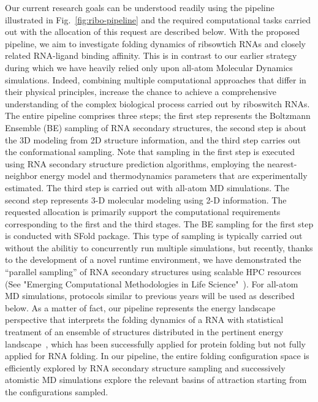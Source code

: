 \documentclass[a4paper,10pt]{article}
\begin{document}
Our current research goals can be understood readily using the pipeline illustrated in Fig.~\ref{fig:ribo-pipeline} and the required computational tasks carried out with the allocation of this request are described below. With the proposed pipeline, we aim to investigate folding dynamics of ribsowtich RNAs and closely related RNA-ligand binding affinity.  This is in contrast to our earlier strategy during which we have heavily relied only upon all-atom Molecular Dynamics simulations.  Indeed, combining multiple computational approaches that differ in their physical principles, increase the chance to achieve a comprehensive understanding of the complex biological process carried out by riboswitch RNAs.  The entire pipeline comprises three steps; the first step represents the Boltzmann Ensemble (BE) sampling of RNA secondary structures, the second step is about the 3D modeling from 2D structure information, and the third step carries out the conformational sampling.  Note that sampling in the first step is executed using RNA secondary structure prediction algorithms, employing the nearest-neighbor energy model and thermodynamics parameters that are experimentally estimated.  The third step is carried out with all-atom MD simulations. The second step represents 3-D molecular modeling using 2-D information.  The requested allocation is primarily support the computational requirements corresponding to the first and the third stages. The BE sampling for the first step is conducted with SFold package\cite{ding2006}.  This type of sampling is typically carried out without the abilitiy to concurrently run multiple simulations, but recently, thanks to the development of a novel runtime environment, we have demonstrated the ``parallel sampling'' of RNA secondary structures using scalable HPC resources (See "Emerging Computational Methodologies in Life Science"~\cite{ecmls10}). For all-atom MD simulations, protocols similar to previous years will be used as described below. As a matter of fact, our pipeline represents the energy landscape perspective that interprets the folding dynamics of a RNA with statistical treatment of an ensemble of structures distributed in the pertinent energy landscape~\cite{onuchic1997}, which has been successfully applied for protein folding but not fully applied for RNA folding\cite{cupal1997}. In our pipeline, the entire folding configuration space is efficiently explored by RNA secondary structure sampling and successively atomistic MD simulations explore the relevant basins of attraction starting from the configurations sampled.
\end{document}
